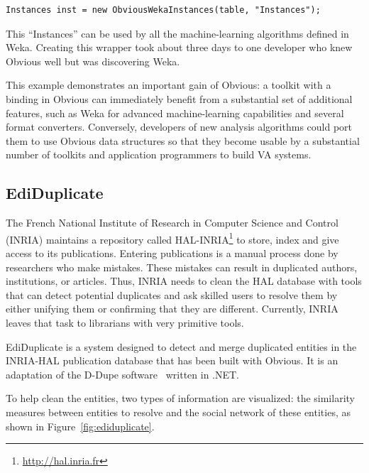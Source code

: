 \begin{lstlisting}[caption={Wrapping an Obvious Table into Weka Instances},label=wekaExample]
Instances inst = new ObviousWekaInstances(table, "Instances");
\end{lstlisting}


This ``Instances'' can be used by all the machine-learning algorithms
defined in Weka.  Creating this wrapper took about three days to one
developer who knew Obvious well but was discovering Weka.

This example demonstrates an important gain of Obvious: a toolkit with
a binding in Obvious can immediately benefit from a substantial set of
additional features, such as Weka for advanced machine-learning
capabilities and several format converters.  Conversely, developers of
new analysis algorithms could port them to use Obvious data structures
so that they become usable by a substantial number of toolkits and
application programmers to build VA systems.


\subsection{EdiDuplicate}

The French National Institute of Research in Computer Science and
Control (INRIA) maintains a repository called
HAL-INRIA\footnote{\url{http://hal.inria.fr}} to store, index and give
access to its publications.  Entering publications is a manual process
done by researchers who make mistakes.  These mistakes can result in
duplicated authors, institutions, or articles. Thus, INRIA needs to
clean the HAL database with tools that can detect potential duplicates
and ask skilled users to resolve them by either unifying them or
confirming that they are different.  Currently, INRIA leaves that task
to librarians with very primitive tools.

EdiDuplicate is a system designed to detect and merge duplicated
entities in the INRIA-HAL publication database that has been built
with Obvious.  It is an adaptation of the D-Dupe software~\cite{DDupe}
written in .NET.  

To help clean the entities, two types of information are visualized:
the similarity measures between entities to resolve and the social
network of these entities, as shown in Figure~\ref{fig:ediduplicate}.

